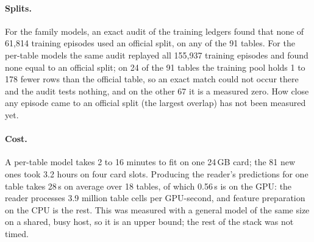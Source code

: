 \paragraph{Splits.} For the family models, an exact audit of the training ledgers found that none of 61,814 training episodes used an official split, on any of the 91 tables. For the per-table models the same audit replayed all 155,937 training episodes and found none equal to an official split; on 24 of the 91 tables the training pool holds 1 to 178 fewer rows than the official table, so an exact match could not occur there and the audit tests nothing, and on the other 67 it is a measured zero. How close any episode came to an official split (the largest overlap) has not been measured yet.

\paragraph{Cost.} A per-table model takes 2 to 16 minutes to fit on one 24\,GB card; the 81 new ones took 3.2 hours
on four card slots. Producing the reader's predictions for one table takes 28\,s on average over 18 tables, of
which 0.56\,s is on the GPU: the reader processes 3.9 million table cells per GPU-second, and feature preparation
on the CPU is the rest. This was measured with a general model of the same size on a shared, busy host, so it is
an upper bound; the rest of the stack was not timed.
